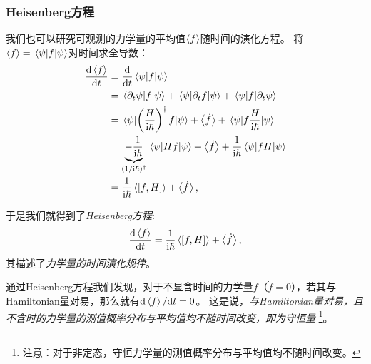 \subsubsection{Heisenberg方程}

我们也可以研究可观测的力学量的平均值$\expval{f}$随时间的演化方程。
将$\expval{f}=\mel{\psi}{f}{\psi}$对时间求全导数：
\begin{equation}
\begin{aligned}
\frac{\dd \expval{f}}{\dd t}
&= \frac{\dd}{\dd t} \mel{\psi}{f}{\psi} \\
&= \mel{\partial_t \psi}{f}{\psi} + \mel{\psi}{\partial_t f}{\psi} + \mel{\psi}{f}{\partial_t \psi} \\
&= \mel{\psi}{\left(\frac{H}{\mathrm{i}\hbar}\right)^\dagger f}{\psi} + \expval{\dot{f}} + \mel{\psi}{f \frac{H}{\mathrm{i}\hbar}}{\psi} \\
&= \underbrace{-\frac{1}{\mathrm{i}\hbar}}_{(1/\mathrm{i}\hbar)^\dagger}\mel{\psi}{H f}{\psi} + \expval{\dot{f}} + \frac{1}{\mathrm{i}\hbar}\mel{\psi}{fH}{\psi} \\
&= \frac{1}{\mathrm{i}\hbar}\expval{[f,H]} + \expval{\dot{f}},
\end{aligned}
\end{equation}
\begin{tcolorbox}
于是我们就得到了\emph{Heisenberg方程}:
\begin{equation}
    \frac{\dd \expval{f}}{\dd t} = \frac{1}{\mathrm{i}\hbar}\expval{[f,H]} + \expval{\dot{f}},
\end{equation}
其描述了\emph{力学量的时间演化规律}。
\end{tcolorbox}

通过Heisenberg方程我们发现，对于不显含时间的力学量$f$（$\dot{f}=0$），若其与Hamiltonian量对易，那么就有$\dd \expval{f}/\dd t = 0$。
这是说，\emph{与Hamiltonian量对易，且不含时的力学量的测值概率分布与平均值均不随时间改变，即为守恒量}
\footnote{注意：对于非定态，守恒力学量的测值概率分布与平均值均不随时间改变。}。
